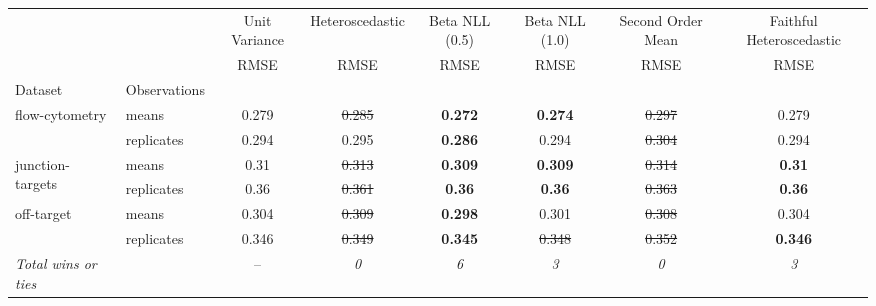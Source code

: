 \begin{tabular}{ll|c|c|c|c|c|c}
\toprule
{} & {} & {Unit Variance} & {Heteroscedastic} & {Beta NLL (0.5)} & {Beta NLL (1.0)} & {Second Order Mean} & {Faithful Heteroscedastic} \\
{} & {} & {RMSE} & {RMSE} & {RMSE} & {RMSE} & {RMSE} & {RMSE} \\
{Dataset} & {Observations} & {} & {} & {} & {} & {} & {} \\
\midrule
\multirow[t]{2}{*}{flow-cytometry} & means & 0.279 & \sout{0.285} & \textbf{0.272} & \textbf{0.274} & \sout{0.297} & 0.279 \\
 & replicates & 0.294 & 0.295 & \textbf{0.286} & 0.294 & \sout{0.304} & 0.294 \\
\multirow[t]{2}{*}{junction-targets} & means & 0.31 & \sout{0.313} & \textbf{0.309} & \textbf{0.309} & \sout{0.314} & \textbf{0.31} \\
 & replicates & 0.36 & \sout{0.361} & \textbf{0.36} & \textbf{0.36} & \sout{0.363} & \textbf{0.36} \\
\multirow[t]{2}{*}{off-target} & means & 0.304 & \sout{0.309} & \textbf{0.298} & 0.301 & \sout{0.308} & 0.304 \\
 & replicates & 0.346 & \sout{0.349} & \textbf{0.345} & \sout{0.348} & \sout{0.352} & \textbf{0.346} \\
\textit{{Total wins or ties}} &  & -- & \textit{0} & \textit{6} & \textit{3} & \textit{0} & \textit{3} \\
\bottomrule
\end{tabular}

